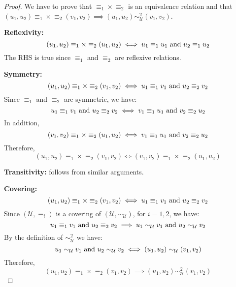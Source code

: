 \documentclass{article} %
\begin{document}
\begin{proof} We have to prove that $\equiv_1 \times \equiv_2$ is an equivalence relation and that $(u_1,u_2) \equiv_1 \times \equiv_2 (v_1,v_2) \implies (u_1,u_2) \sim^2_{\mathcal{U}} (v_1,v_2)$.

\textbf{Reflexivity:} 
\begin{equation}
(u_1,u_2) \equiv_1 \times \equiv_2 (u_1,u_2) \iff u_1 \equiv_1 u_1 \textnormal{ and } u_2 \equiv_1 u_2
\end{equation}
The RHS is true since $\equiv_1$ and $\equiv_2$ are reflexive relations.

\textbf{Symmetry:} 
\begin{equation}
(u_1,u_2) \equiv_1 \times \equiv_2  (v_1,v_2) \iff u_1 \equiv_1 v_1 \textnormal{ and } u_2 \equiv_2 v_2
\end{equation}
Since $\equiv_1$ and $\equiv_2$ are symmetric, we have:
\begin{equation}
u_1 \equiv_1 v_1 \textnormal{ and } u_2 \equiv_2 v_2 \iff 
v_1 \equiv_1 u_1 \textnormal{ and } v_2 \equiv_2 u_2
\end{equation}
In addition, 
\begin{equation}
(v_1,v_2) \equiv_1 \times \equiv_2 (u_1,u_2) \iff v_1 \equiv_1 u_1 \textnormal{ and } v_2 \equiv_2 u_2
\end{equation}
Therefore,
\begin{equation}
(u_1,u_2) \equiv_1 \times \equiv_2 (v_1,v_2) \iff (v_1,v_2) \equiv_1 \times \equiv_2 (u_1,u_2)
\end{equation}


\textbf{Transitivity:} follows from similar arguments.

\textbf{Covering:} 
\begin{equation}
(u_1,u_2) \equiv_1 \times \equiv_2 (v_1,v_2) \iff u_1 \equiv_1 v_1 \textnormal{ and } u_2 \equiv_2 v_2
\end{equation}
Since $(\mathcal{U},\equiv_i)$ is a covering of $(\mathcal{U},\sim_\mathcal{U})$, for $i=1,2$, we have:
\begin{equation}
u_1 \equiv_1 v_1 \textnormal{ and } u_2 \equiv_2 v_2 \implies u_1 \sim_\mathcal{U} v_1 \textnormal{ and } u_2 \sim_\mathcal{U} v_2
\end{equation}
By the definition of $\sim^2_{\mathcal{U}}$ we have:
\begin{equation}
u_1 \sim_{\mathcal{U}} v_1 \textnormal{ and } u_2 \sim_{\mathcal{U}} v_2
\iff (u_1,u_2) \sim_{\mathcal{U}} (v_1,v_2)
\end{equation}
Therefore, 
\begin{equation}
(u_1,u_2) \equiv_1 \times \equiv_2 (v_1,v_2) \implies (u_1,u_2) \sim^2_{\mathcal{U}} (v_1,v_2)
\end{equation}
\end{proof}
\end{document}
